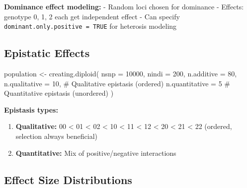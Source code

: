 \documentclass[
  letterpaper,
]{book}
\newenvironment{Shaded}{\begin{snugshade}}{\end{snugshade}}
\newcommand{\AttributeTok}[1]{\textcolor[rgb]{0.40,0.45,0.13}{#1}}
\newcommand{\CommentTok}[1]{\textcolor[rgb]{0.37,0.37,0.37}{#1}}
\newcommand{\DecValTok}[1]{\textcolor[rgb]{0.68,0.00,0.00}{#1}}
\newcommand{\FunctionTok}[1]{\textcolor[rgb]{0.28,0.35,0.67}{#1}}
\newcommand{\NormalTok}[1]{\textcolor[rgb]{0.00,0.23,0.31}{#1}}
\newcommand{\OtherTok}[1]{\textcolor[rgb]{0.00,0.23,0.31}{#1}}
\providecommand{\tightlist}{%
  \setlength{\itemsep}{0pt}\setlength{\parskip}{0pt}}
\begin{document}
\textbf{Dominance effect modeling:} - Random loci chosen for dominance -
Effects: genotype 0, 1, 2 each get independent effect - Can specify
\texttt{dominant.only.positive\ =\ TRUE} for heterosis modeling

\subsection{Epistatic Effects}\label{epistatic-effects}

\begin{Shaded}
\begin{Highlighting}[]
\NormalTok{population }\OtherTok{\textless{}{-}} \FunctionTok{creating.diploid}\NormalTok{(}
  \AttributeTok{nsnp =} \DecValTok{10000}\NormalTok{,}
  \AttributeTok{nindi =} \DecValTok{200}\NormalTok{,}
  \AttributeTok{n.additive =} \DecValTok{80}\NormalTok{,}
  \AttributeTok{n.qualitative =} \DecValTok{10}\NormalTok{,    }\CommentTok{\# Qualitative epistasis (ordered)}
  \AttributeTok{n.quantitative =} \DecValTok{5}     \CommentTok{\# Quantitative epistasis (unordered)}
\NormalTok{)}
\end{Highlighting}
\end{Shaded}

\textbf{Epistasis types:}

\begin{enumerate}
\def\labelenumi{\arabic{enumi}.}
\tightlist
\item
  \textbf{Qualitative:} 00 \textless{} 01 \textless{} 02 \textless{} 10
  \textless{} 11 \textless{} 12 \textless{} 20 \textless{} 21
  \textless{} 22 (ordered, selection always beneficial)
\item
  \textbf{Quantitative:} Mix of positive/negative interactions
\end{enumerate}

\subsection{Effect Size Distributions}\label{effect-size-distributions}
\end{document}
